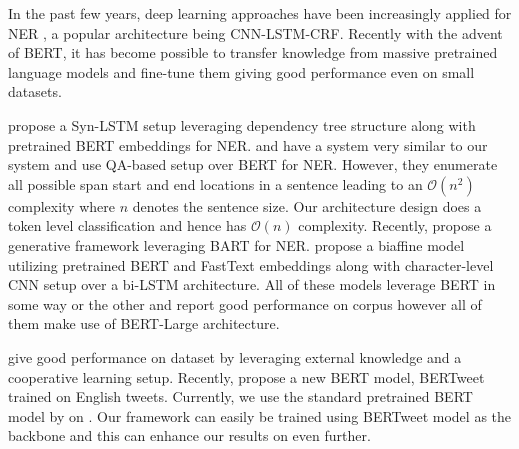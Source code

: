 In the past few years, deep learning approaches have been increasingly applied for NER \cite{torfi2020natural, li2020survey}, a popular architecture being CNN-LSTM-CRF\cite{ma2016end}. 
Recently with the advent of BERT\cite{devlin2019bert}, it has become possible to transfer knowledge from massive pretrained language models and fine-tune them giving good performance even on small datasets.

\cite{xu2021better} propose a Syn-LSTM setup leveraging dependency tree structure along with pretrained BERT embeddings for NER. \cite{li2020MRC} and \cite{li2019dice} have a system very similar to our system and use QA-based setup over BERT for NER. However, they enumerate all possible span start and end locations in a sentence leading to an $\mathcal{O}(n^2)$ complexity where $n$ denotes the sentence size. Our architecture design does a token level classification and hence has $\mathcal{O}(n)$ complexity. Recently, \cite{yan2021unified} propose a generative framework leveraging BART\cite{lewis2019bart} for NER. \cite{yu2020named} propose a biaffine model utilizing pretrained BERT and FastText \cite{bojanowski2017enriching} embeddings along with character-level CNN setup over a bi-LSTM architecture. All of these models leverage BERT in some way or the other and report good performance on  corpus however all of them make use of BERT-Large architecture. 

\cite{wang2021improving} give good performance on  dataset by leveraging external knowledge and a cooperative learning setup. Recently, \cite{nguyen2020bertweet} propose a new BERT model, BERTweet trained on English tweets. Currently, we use the standard pretrained BERT model by \cite{devlin2019bert} on . Our framework can easily be trained using BERTweet model as the backbone and this can enhance our results on  even further.

